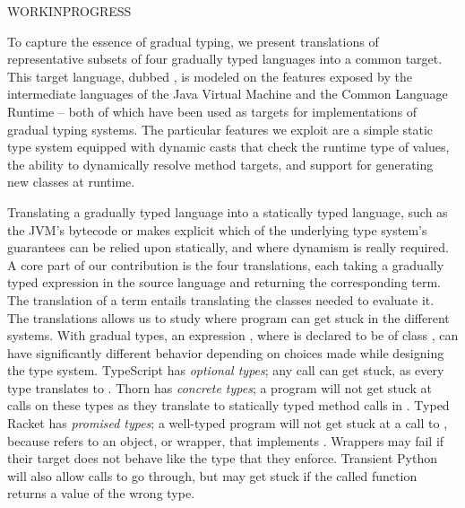 \documentclass[runnningheads]{tex/llncs}
\begin{document}
WORKINPROGRESS


To capture the essence of gradual typing, we present translations of
representative subsets of four gradually typed languages into a common
target. This target language, dubbed \kafka, is modeled on the features
exposed by the intermediate languages of the Java Virtual Machine and the
Common Language Runtime -- both of which have been used as targets for
implementations of gradual typing systems.  The particular features we
exploit are a simple static type system equipped with dynamic casts that
check the runtime type of values, the ability to dynamically resolve method
targets, and support for generating new classes at runtime.

Translating a gradually typed language into a statically typed language,
such as the JVM's bytecode or \kafka makes explicit which of the underlying
type system's guarantees can be relied upon statically, and where dynamism
is really required. A core part of our contribution is the four
translations, each taking a gradually typed expression \HT\e\T in the source
language and returning the corresponding \kafka term. The translation of a
term entails translating the classes needed to evaluate it.  The
translations allows us to study where program can get stuck in the different
systems.  With gradual types, an expression \Call\x\m\e, where \x is
declared to be of class \C, can have significantly different behavior
depending on choices made while designing the type system. TypeScript has
\emph{optional types}; any call can get stuck, as every type translates to
\any. Thorn has \emph{concrete types}; a program will not get stuck at calls
on these types as they translate to statically typed method calls in
\kafka. Typed Racket has \emph{promised types}; a well-typed program will
not get stuck at a call to \m, because \x refers to an object, or wrapper,
that implements \m. Wrappers may fail if their target does not behave like
the type that they enforce. Transient Python will also allow calls to go
through, but may get stuck if the called function returns a value of the
wrong type.
\end{document}
